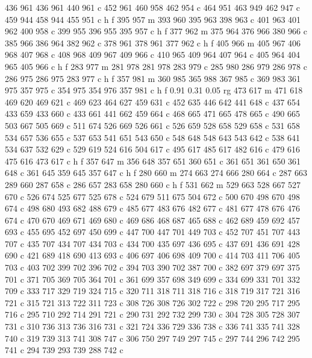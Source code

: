 {{   436 961 436 961 440 961 c
   452 961 460 958 462 954 c
   464 951 463 949 462 947 c
   459 944 458 944 455 951 c
   h f
   395 957 m
   393 960 395 963 398 963 c
   401 963 401 962 400 958 c
   399 955 396 955 395 957 c
   h f
   377 962 m
   375 964 376 966 380 966 c
   385 966 386 964 382 962 c
   378 961 378 961 377 962 c
   h f
   405 966 m
   405 967 406 968 407 968 c
   408 968 409 967 409 966 c
   410 965 409 964 407 964 c
   405 964 404 965 405 966 c
   h f
   283 977 m
   281 978 281 978 283 979 c
   285 980 286 979 286 978 c
   286 975 286 975 283 977 c
   h f
   357 981 m
   360 985 365 988 367 985 c
   369 983 361 975 357 975 c
   354 975 354 976 357 981 c
   h f
   0.91 0.31 0.05 rg
   473 617 m
   471 618 469 620 469 621 c
   469 623 464 627 459 631 c
   452 635 446 642 441 648 c
   437 654 433 659 433 660 c
   433 661 441 662 459 664 c
   468 665 471 665 478 665 c
   490 665 503 667 505 669 c
   511 674 526 669 526 661 c
   526 659 528 658 529 658 c
   531 658 534 657 536 655 c
   537 653 541 651 543 650 c
   548 648 548 643 543 642 c
   538 641 534 637 532 629 c
   529 619 524 616 504 617 c
   495 617 485 617 482 616 c
   479 616 475 616 473 617 c
   h f
   357 647 m
   356 648 357 651 360 651 c
   361 651 361 650 361 648 c
   361 645 359 645 357 647 c
   h f
   280 660 m
   274 663 274 666 280 664 c
   287 663 289 660 287 658 c
   286 657 283 658 280 660 c
   h f
   531 662 m
   529 663 528 667 527 670 c
   526 674 525 677 525 678 c
   524 679 511 675 504 672 c
   500 670 498 670 498 674 c
   498 680 493 682 488 679 c
   485 677 483 676 482 677 c
   481 677 478 676 476 674 c
   470 670 469 671 469 680 c
   469 686 468 687 465 688 c
   462 689 459 692 457 693 c
   455 695 452 697 450 699 c
   447 700 447 701 449 703 c
   452 707 451 707 443 707 c
   435 707 434 707 434 703 c
   434 700 435 697 436 695 c
   437 691 436 691 428 690 c
   421 689 418 690 413 693 c
   406 697 406 698 409 700 c
   414 703 411 706 405 703 c
   403 702 399 702 396 702 c
   394 703 390 702 387 700 c
   382 697 379 697 375 701 c
   371 705 369 705 364 701 c
   361 699 357 698 349 699 c
   334 699 331 701 332 709 c
   333 717 329 719 324 715 c
   320 711 318 711 318 716 c
   318 719 317 721 316 721 c
   315 721 313 722 311 723 c
   308 726 308 726 302 722 c
   298 720 295 717 295 716 c
   295 710 292 714 291 721 c
   290 731 292 732 299 730 c
   304 728 305 728 307 731 c
   310 736 313 736 316 731 c
   321 724 336 729 336 738 c
   336 741 335 741 328 740 c
   319 739 313 741 308 747 c
   306 750 297 749 297 745 c
   297 744 296 742 295 741 c
   294 739 293 739 288 742 c
}}
